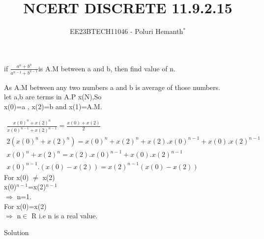 \documentclass[journal,12pt,twocolumn]{IEEEtran}
\theoremstyle{remark}
\begin{document}

\vspace{3cm}


\title{NCERT DISCRETE 11.9.2.15}
\author{EE23BTECH11046 - Poluri Hemanth$^{*}$}



if \( \frac{a^n +b^n}{a^{n-1} + b^{n-1}}\)is A.M between a and b, then find value of n.
\break

 As A.M between any two numbers a and b is average of those  numbers.\\
 let a,b are terms in A.P x(N),So\\
 x(0)=a , x(2)=b and x(1)=A.M.
 
 \begin{align}	 
      \frac{x(0)^n +x(2)^n}{x(0)^{n-1} + x(2)^{n-1}}= \frac{x(0)+x(2)}{2}  \\
      2(x(0)^n +x(2)^n) = x(0)^n +x(2)^n +x(2).x(0)^{n-1}+x(0).x(2)^{n-1} \\
      x(0)^n +x(2)^n = x(2).x(0)^{n-1}+x(0).x(2)^{n-1} \\
      x(0)^{n-1}.(x(0)-x(2))=x(2)^{n-1}(x(0)-x(2))
 \end{align}
 For x(0) $\neq$ x(2) \\
 x(0)$^{n-1}$=x(2)$^{n-1}$ \\
 $\Rightarrow$ n=1.\\
  For x(0)=x(2)\\
$\Rightarrow$ n$\in$ R  i.e n is a real value.\newline
\begin{table}[h!]
    
    \caption{Solution}
    \label{tab:11.9.2.15}
\end{table}
\end{document}
